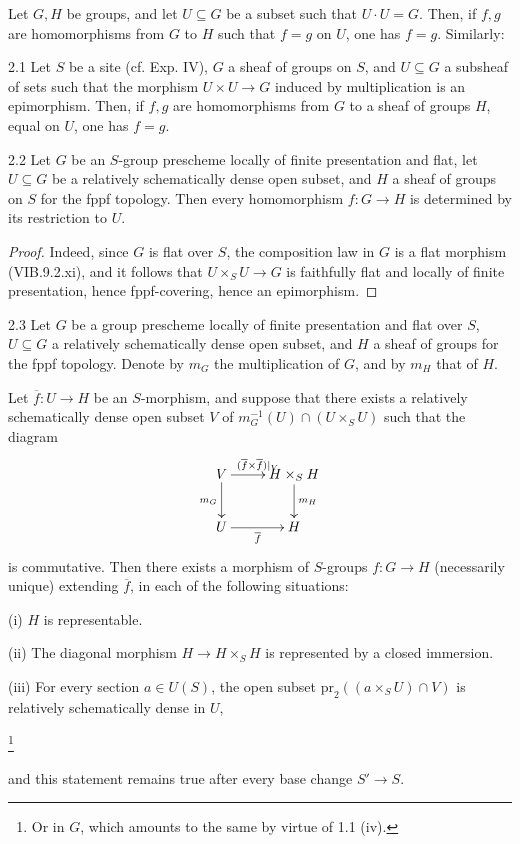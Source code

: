 Let \(G,H\) be groups, and let \(U\subseteq G\)
be a subset such that \(U\cdot U=G\).
Then, if \(f,g\) are homomorphisms from \(G\)
to \(H\) such that \(f=g\) on \(U\), one has \(f=g\).
Similarly:
\begin{proposition}{2.1}\label{XVIII.2.1}
Let \(S\) be a site (cf. Exp. IV),
\(G\) a sheaf of groups on \(S\), and
\(U\subseteq G\) a subsheaf of sets such that
the morphism \(U\times U\to G\) induced by
multiplication is an epimorphism.
Then, if \(f,g\) are homomorphisms from \(G\)
to a sheaf of groups \(H\), equal on \(U\),
one has \(f=g\).
\end{proposition}
\begin{corollary}{2.2}\label{XVIII.2.2}
Let \(G\) be an \(S\)-group prescheme locally
of finite presentation and flat, let
\(U\subseteq G\) be a relatively schematically
dense open subset, and \(H\) a sheaf of groups
on \(S\) for the fppf topology.
Then every homomorphism \(f:G\to H\)
is determined by its restriction to \(U\).
\end{corollary}
\begin{proof}
Indeed, since \(G\) is flat over \(S\),
the composition law in \(G\) is a flat
morphism (VIB.9.2.xi), and it follows that
\(U\times_S U\to G\) is faithfully flat
and locally of finite presentation,
hence fppf-covering, hence an epimorphism.
\end{proof}
\begin{proposition}{2.3}\label{XVIII.2.3}
Let \(G\) be a group prescheme locally
of finite presentation and flat over \(S\),
\(U\subseteq G\) a relatively schematically
dense open subset, and \(H\) a sheaf of
groups for the fppf topology.
Denote by \(m_G\) the multiplication of
\(G\), and by \(m_H\) that of \(H\).

Let \(\overline f:U\to H\) be an \(S\)-morphism,
and suppose that there exists a relatively
schematically dense open subset \(V\) of
\(m_G^{-1}(U)\cap(U\times_S U)\) such that the diagram
\[
\xymatrix{
V\ar[r]^{(\overline f\times\overline f)|_V}\ar[d]_{m_G}
 & H\times_S H\ar[d]^{m_H}\\
U\ar[r]_{\overline f} & H }
\]
is commutative. Then there exists a morphism
of \(S\)-groups \(f:G\to H\) (necessarily
unique) extending \(\overline f\), in each
of the following situations:

(i) \(H\) is representable.

(ii) The diagonal morphism \(H\to H\times_S H\)
is represented by a closed immersion.

(iii) For every section \(a\in U(S)\),
the open subset
\(\mathrm{pr}_2((a\times_S U)\cap V)\)
is relatively schematically dense in \(U\),
{\renewcommand{\thefootnote}{(*)}\addtocounter{footnote}{-1}%
\footnote{Or in \(G\), which amounts to the same
by virtue of 1.1 (iv).}}
and this statement remains true after
every base change \(S'\to S\).
\end{proposition}
